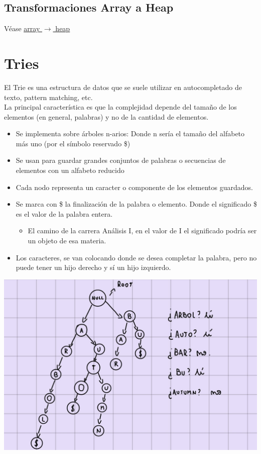 \documentclass[10pt,a4paper]{article}
\begin{document}
\subsection*{Transformaciones Array a Heap}
Véase \hyperref[subsec:array_2_heap]{\underline{array $\rightarrow$ heap}}
\section*{Tries}
El Trie es una estructura de datos que se suele utilizar en autocompletado de texto, pattern matching, etc.  \\
La principal característica es que la complejidad depende del tamaño de los elementos (en general, palabras) y no de la cantidad de elementos.
\begin{itemize}
    \item Se implementa sobre árboles n-arios: Donde n sería el tamaño del alfabeto más uno (por el símbolo reservado \$)
    \item Se usan para guardar grandes conjuntos de palabras o secuencias de elementos con un alfabeto reducido
    \item Cada nodo representa un caracter o componente de los elementos guardados.
    \item Se marca con \$ la finalización de la palabra o elemento. Donde el significado \$ es el valor de la palabra entera.
    \begin{itemize}
        \item El camino de la carrera Análisis I, en el valor de I el significado podría ser un objeto de esa materia.
    \end{itemize}
    \item Los caracteres, se van colocando donde se desea completar la palabra, pero no puede tener un hijo derecho y sí un hijo izquierdo.
\end{itemize}
\begin{center}
    \begin{minipage}[b]{0.6\textwidth}
        \includegraphics[width=\linewidth]{assets/trie.jpg}
        \centering
        \label{fig:trie}
    \end{minipage}
\end{center}
\end{document}
